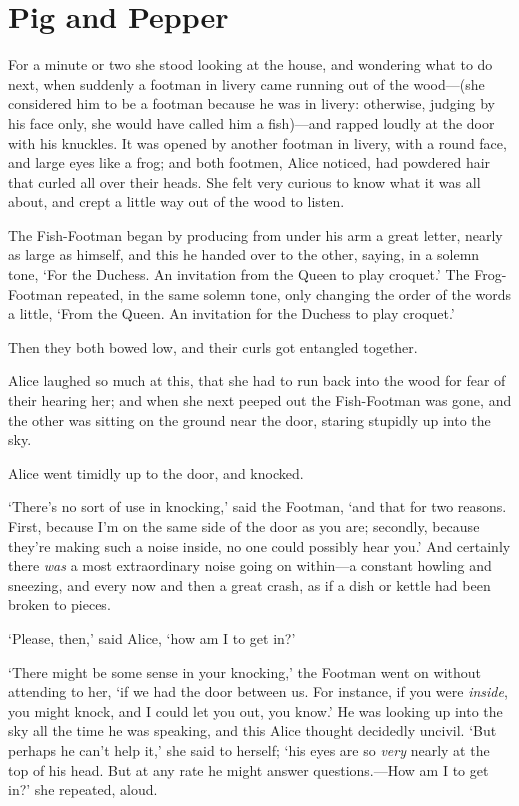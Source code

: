 \documentclass[12pt,openany]{memoir}
\begin{document}
\chapter{Pig and Pepper}

For a minute or two she stood looking at the house, and wondering what to do next, when suddenly a footman in livery came running out of the wood---(she considered him to be a footman because he was in livery: otherwise, judging by his face only, she would have called him a fish)---and rapped loudly at the door with his knuckles. It was opened by another footman in livery, with a round face, and large eyes like a frog; and both footmen, Alice noticed, had powdered hair that curled all over their heads. She felt very curious to know what it was all about, and crept a little way out of the wood to listen.

The Fish-Footman began by producing from under his arm a great letter, nearly as large as himself, and this he handed over to the other, saying, in a solemn tone, `For the Duchess. An invitation from the Queen to play croquet.' The Frog-Footman repeated, in the same solemn tone, only changing the order of the words a little, `From the Queen. An invitation for the Duchess to play croquet.'

Then they both bowed low, and their curls got entangled together.

Alice laughed so much at this, that she had to run back into the wood for fear of their hearing her; and when she next peeped out the Fish-Footman was gone, and the other was sitting on the ground near the door, staring stupidly up into the sky.

Alice went timidly up to the door, and knocked.

`There's no sort of use in knocking,' said the Footman, `and that for two reasons. First, because I'm on the same side of the door as you are; secondly, because they're making such a noise inside, no one could possibly hear you.' And certainly there \textit{was} a most extraordinary noise going on within---a constant howling and sneezing, and every now and then a great crash, as if a dish or kettle had been broken to pieces.

`Please, then,' said Alice, `how am I to get in?'

`There might be some sense in your knocking,' the Footman went on without attending to her, `if we had the door between us. For instance, if you were \textit{inside}, you might knock, and I could let you out, you know.' He was looking up into the sky all the time he was speaking, and this Alice thought decidedly uncivil. `But perhaps he can't help it,' she said to herself; `his eyes are so \textit{very} nearly at the top of his head. But at any rate he might answer questions.---How am I to get in?' she repeated, aloud.
\end{document}
